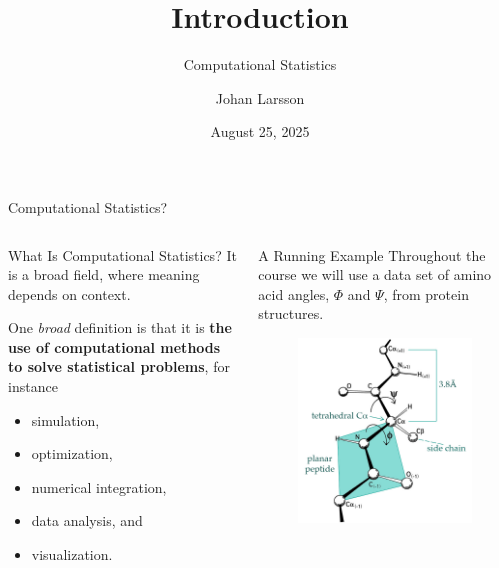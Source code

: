 \documentclass[
  ignorenonframetext,
  aspectratio=1610,
  onlytextwidth]{beamer}
\title{Introduction}
\subtitle{Computational Statistics}
\author{Johan Larsson}
\date{August 25, 2025}
\institute{Department of Mathematical Sciences, University of
Copenhagen}
\providecommand{\tightlist}{}
\begin{document}
\frame{\titlepage}


\begin{frame}{Computational Statistics?}
\label{computational-statistics}
\begin{columns}[T]
\begin{column}{0.47\linewidth}
\begin{block}{What Is Computational Statistics?}
\label{what-is-computational-statistics}
It is a broad field, where meaning depends on context.

\pause

\bipskip

One \emph{broad} definition is that it is \textbf{the use of
computational methods to solve statistical problems}, for instance

\begin{itemize}[<+->]
\tightlist
\item
  simulation,
\item
  optimization,
\item
  numerical integration,
\item
  data analysis, and
\item
  visualization.
\end{itemize}
\end{block}
\end{column}

\pause

\begin{column}{0.47\linewidth}
\begin{block}{A Running Example}
\label{a-running-example}
Throughout the course we will use a data set of amino acid angles,
\(\Phi\) and \(\Psi\), from protein structures.

\begin{figure}[H]

{\centering \includegraphics[width=0.7\linewidth,height=\textheight,keepaspectratio]{../images/PhiPsi_creative.jpg}

}
\end{figure}
\end{block}
\end{column}
\end{columns}
\end{frame}
\end{document}
